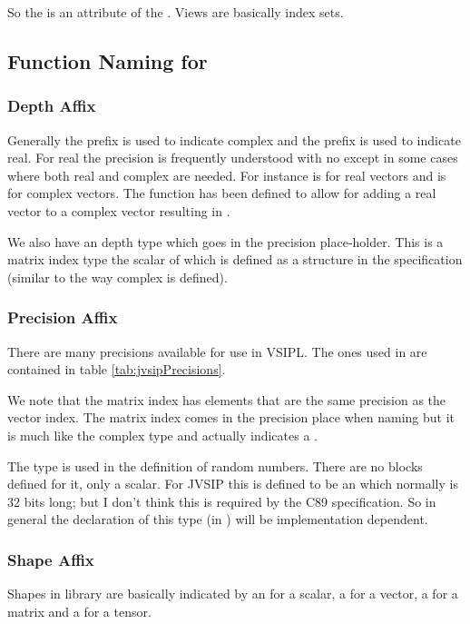So the  is an attribute of the . Views are basically index sets.
%
\subsection*{Function Naming for \cvl}
\subsubsection*{Depth Affix}
Generally the prefix  is used to indicate complex and the prefix  is used to indicate real. For real the precision is frequently understood with no  except in some cases where both real and complex are needed. For instance  is for real vectors and  is for complex vectors. The function  has been defined to allow for adding a real vector to a complex vector resulting in .

We also have an  depth type which goes in the precision place-holder. This is a matrix index type the scalar of which is defined as a structure in the \cvl specification (similar to the way complex is defined).
%
\subsubsection*{Precision Affix}
There are many precisions available for use in VSIPL. The ones used in \jv are contained in table \ref{tab:jvsipPrecisions}.  

We note that the matrix index has elements that are the same precision as the vector index. The matrix index comes in the precision place when naming but it is much like the complex type and actually indicates a .

The type  is used in the definition of  random numbers. There are no blocks defined for it, only a scalar.  For JVSIP this is defined to be an  which normally is 32 bits long; but I don't think this is required by the C89 specification. So in general the declaration of this type (in ) will be implementation dependent.

%
\subsubsection*{Shape Affix}
Shapes in \cv library are basically indicated by an  for a scalar, a  for a vector, a  for a matrix and a  for a tensor.

